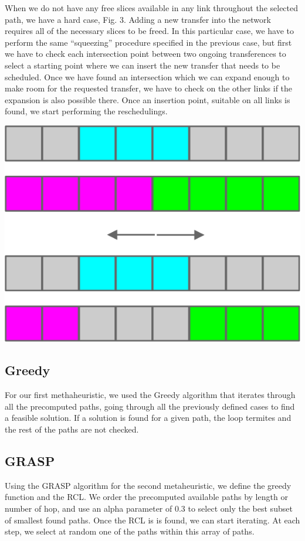 \documentclass[11pt,a4paper]{article}
\begin{document}
When we do not have any free slices available in any link throughout the selected path, we have a hard case, Fig. 3. Adding a new transfer into the network requires all of the necessary slices to be freed. In this particular case, we have to perform the same “squeezing” procedure specified in the previous case, but first we have to check each intersection point between two ongoing transferences to select a starting point where we can insert the new transfer that needs to be scheduled. Once we have found an intersection which we can expand enough to make room for the requested transfer, we have to check on the other links if the expansion is also possible there. Once an insertion point, suitable on all links is found, we start performing the reschedulings.

\includegraphics[scale=1]{hardcase.jpg}

 \subsection{Greedy}
For our first methaheuristic, we used the Greedy algorithm that iterates through all the precomputed paths, going through all the previously defined cases to find a feasible solution. If a solution is found for a given path, the loop termites and the rest of the paths are not checked.
 
 \subsection{GRASP}
Using the GRASP algorithm for the second metaheuristic, we define the greedy function and the RCL. We order the precomputed available paths by length or number of hop, and use an alpha parameter of 0.3 to select only the best subset of smallest found paths. Once the RCL is is found, we can start iterating. At each step, we select at random one of the paths within this array of paths.\\
\end{document}
